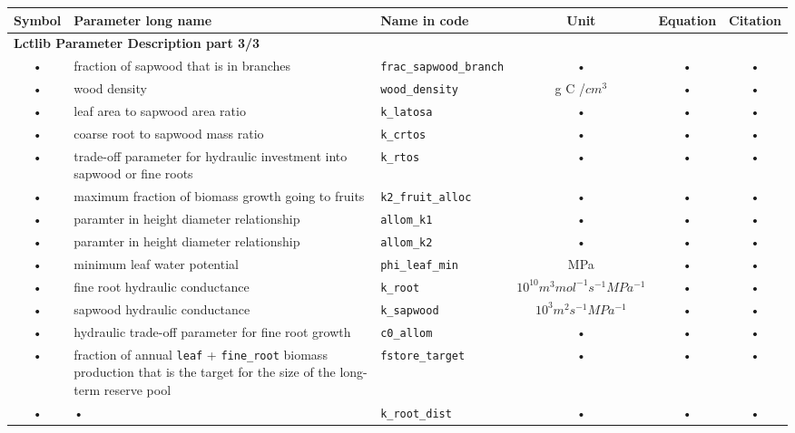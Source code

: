 \begin{table}
\begin{tabularx}{\linewidth}{|c|X|l|c|c|c|} %
\hline 
Symbol & Parameter long name & Name in code & Unit & Equation & Citation \\ 
\hline 

\multicolumn{6}{l}{\bf Lctlib Parameter Description part 3/3}\\
\hline
 • & fraction of sapwood that is in branches & \texttt{frac\_sapwood\_branch} & • & • & • \\
 • & wood density & \texttt{wood\_density} & g C /$cm^3$ & • & • \\
 • & leaf area to sapwood area ratio & \texttt{k\_latosa} & • & • & • \\
 • & coarse root to sapwood mass ratio & \texttt{k\_crtos} & • & • & • \\
 • & trade-off parameter for hydraulic investment into sapwood or fine roots & \texttt{k\_rtos} & • & • & • \\
 • & maximum fraction of biomass growth going to fruits & \texttt{k2\_fruit\_alloc} & • & • & • \\
 • & paramter in height diameter relationship & \texttt{allom\_k1} & • & • & • \\
 • & paramter in height diameter relationship & \texttt{allom\_k2} & • & • & • \\
 • & minimum leaf water potential & \texttt{phi\_leaf\_min} & MPa & • & • \\
 • & fine root hydraulic conductance & \texttt{k\_root} & $10^{10} m^3 mol^{-1} s^{-1} MPa^{-1}$ & • & • \\
 • & sapwood hydraulic conductance & \texttt{k\_sapwood} & $10^3 m^2 s^{-1} MPa^{-1}$ & • & • \\
 • & hydraulic trade-off parameter for fine root growth & \texttt{c0\_allom} & • & • & • \\
 • & fraction of annual \texttt{leaf} + \texttt{fine\_root} biomass production that is the target for the size of the long-term reserve pool & \texttt{fstore\_target} & • & • & • \\
 • & • & \texttt{k\_root\_dist} & • & • & • \\
\hline 
\end{tabularx}
\end{table}



